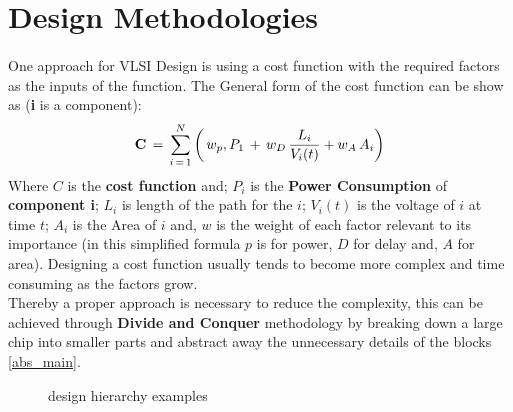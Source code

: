 \section{Design Methodologies}
\paragraph{}
One approach for VLSI Design is using a cost function with the required factors as the inputs of the function. The General form of the cost function can be show as (\textbf{i} is a component):\[
	\mathbf{C}\,=\,\sum_{i\,=\,1}^{N}\left(\,w_{p}\\,P_{1}\,+\,w_{D}\,\frac{L_{i}}{V_{i}(t)}+w_{A}\,A_{i}\right)
\]
Where \large{\(\mathit{C}\)} is the\textbf{ cost function} and; {\large\(P_{i}\)} is the \textbf{Power Consumption} \newline
of \textbf{component i}; \large{\(\mathit{L_{i}}\)} is length of the path for the \(i\);
\large{\(V_{i}(t)\)} is the voltage of \(i\) at time \(t\); \large{\(\mathit{A_{i}}\)} is the Area of \(i\) and, \large{\(w\)} is the weight of each factor relevant to its importance (in this simplified formula \(p\) is for power, \(D\) for delay and, \(A\) for area).\newline
Designing a cost function usually tends to become more complex and time consuming as the factors grow.\\ Thereby a proper approach is necessary to reduce the complexity, this can be achieved through \textbf{Divide and Conquer} methodology by breaking down a large chip into smaller parts and abstract away the unnecessary details of the blocks \autoref{abs_main}.
\begin{figure}[b!]  
\usetikzlibrary {through}
\tikzset{auto}

\hspace{4em}
\caption{design hierarchy examples}
\label{abs_main}
\end{figure}